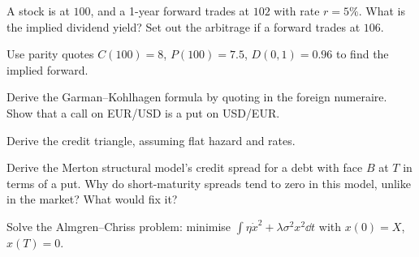 \begin{exercises}
\item A stock is at $100$, and a 1-year forward trades at $102$ with rate $r=5\%$. What is the implied dividend yield? Set out the arbitrage if a forward trades at $106$.
\item Use parity quotes $C(100)=8$, $P(100)=7.5$, $D(0,1)=0.96$ to find the implied forward.
\item Derive the Garman--Kohlhagen formula by quoting in the foreign numeraire. Show that a call on EUR/USD is a put on USD/EUR.
\item Derive the credit triangle, assuming flat hazard and rates.
\item Derive the Merton structural model's credit spread for a debt with face $B$ at $T$ in terms of a put. Why do short-maturity spreads tend to zero in this model, unlike in the market? What would fix it?
\item Solve the Almgren--Chriss problem: minimise $\int\eta\dot x^2+\lambda\sigma^2x^2\dd t$ with $x(0)=X$, $x(T)=0$.
\end{exercises}
